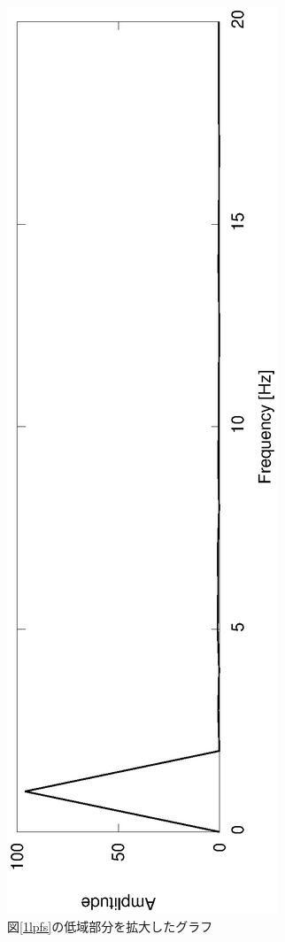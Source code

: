 \documentclass[a4j]{jsarticle}
\begin{document}
\begin{figure}[H]
 \centering
 \vspace{-4cm}
 \hspace{-2cm}
 \includegraphics[angle=-90,scale=0.6]{1stout_LPF_spec_kakudai.eps}
  \vspace{-2cm}
 \caption{図\ref{1lpfs}の低域部分を拡大したグラフ}
 \label{1lpfsk}
\end{figure}
\end{document}
